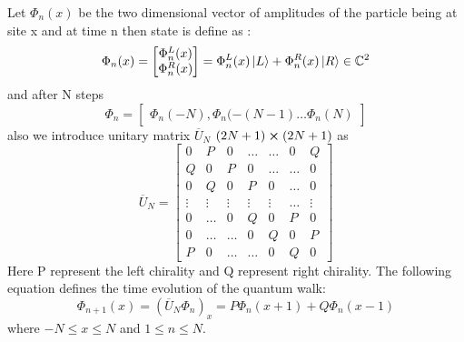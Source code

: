 \documentclass[11 pt]{article}
\theoremstyle{definition}
\theoremstyle{remark}
\begin{document}
Let $\Phi_n(x)$ be the two dimensional vector of amplitudes of the particle being at site x and at time n then state is define as :
$$\Phi_n(x) = \begin{bmatrix}
                \Phi_{n}^L(x)\\
                \Phi_{n}^R(x)
\end{bmatrix}   = \Phi_{n}^L(x)\ket{L} + \Phi_{n}^R(x)\ket{R} \in \mathbb{C}^2$$
and after N steps  $$ \Phi_n = \begin{bmatrix}
        \Phi_n(-N),\Phi_n(-(N-1) \hdots \Phi_n(N)
\end{bmatrix}$$
also we introduce unitary matrix $\overline{U}_N$ $(2N+1) \cross (2N+1)$  as
$$ \overline{U}_N = \begin{bmatrix}
                0 & P & 0 & \hdots & \hdots & 0 & Q\\
                Q & 0 & P & 0 & \hdots & \hdots & 0\\
                0 & Q & 0 & P & 0 & \hdots & 0\\
                \vdots & \vdots & \vdots & \vdots & \vdots & \hdots & \vdots\\
                0 & \hdots & 0 & Q & 0 & P & 0\\
                0 & \hdots & \hdots & 0 & Q & 0 & P\\
                P & 0 & \hdots & \hdots & 0 & Q & 0
\end{bmatrix}$$
Here P represent the left chirality and Q represent right chirality.
\newpage
The following equation defines the time evolution of the quantum walk:
$$  \Phi_{n+1}(x) = (\overline{U}_N\Phi_n)_x = P\Phi_n(x+1) + Q\Phi_n(x-1)$$
where $-N \leq x \leq N$ and $1 \leq n \leq N.$
\end{document}
